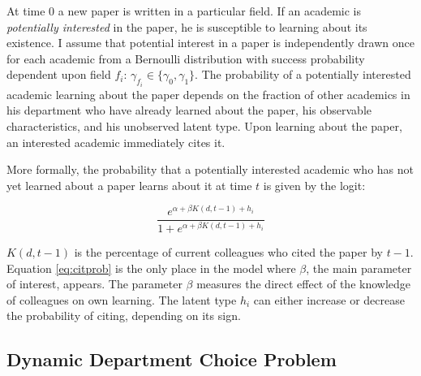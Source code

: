 At time $0$ a new paper
is written in a particular field.  If an academic is \emph{potentially interested} in the
paper, he is susceptible to learning about its existence.
I assume that potential interest in a paper is independently drawn once for each
academic from a Bernoulli distribution with success probability dependent upon field $f_i$: 
$\gamma_{f_i} \in \{\gamma_0, \gamma_1\}$.
The probability of a potentially interested academic learning about the paper
depends on the fraction of
other academics in his department who have already learned about the paper,
his observable characteristics, and his unobserved latent type. Upon
learning about the paper, an interested academic immediately cites it.\footnotemark{}

More formally, the probability that a potentially interested
academic who has not yet learned
about a paper learns about it at time $t$ is given by the
logit:\footnotemark{}

\begin{equation}
    \frac{e^{\alpha + \beta K(d,t-1) + h_i}}{1 + e^{\alpha + \beta K(d,t-1) + h_i}}
    \label{eq:citprob}
\end{equation}

$K(d,t-1)$ is the percentage of current colleagues who cited the
paper by $t-1$. Equation \eqref{eq:citprob} is the only place in the
model where $\beta$, the main parameter of interest, appears. The
parameter $\beta$ measures the direct effect of the knowledge of colleagues on own
learning. The latent type $h_i$ can either increase or decrease the
probability of citing, depending on its sign.

\subsection{Dynamic Department Choice Problem}

